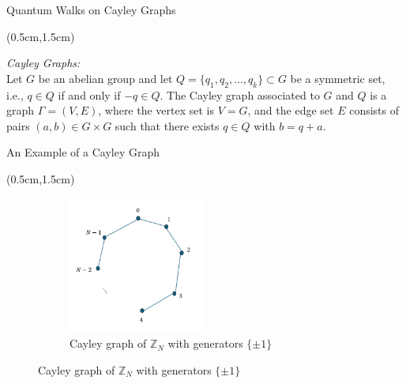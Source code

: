 \documentclass{beamer}
\theoremstyle{definition}
\begin{document}
\begin{frame}{Quantum Walks on Cayley Graphs}
    
    \begin{textblock*}{12cm}(0.5cm,1.5cm)
        
        \textit{Cayley Graphs:} \\
        \vspace{0.3cm}
        Let $G$ be an abelian group and let $Q = \{q_1, q_2, \dots, q_k\} \subset G$ be a symmetric set, i.e., $q \in Q$ if and only if $-q \in Q$. The Cayley graph associated to $G$ and $Q$ is a graph $\Gamma = (V, E)$, where the vertex set is $V = G$, and the edge set $E$ consists of pairs $(a, b) \in G \times G$ such that there exists $q \in Q$ with $b = q + a$. \\
      
    \end{textblock*}

\end{frame}




\begin{frame}{An Example of a Cayley Graph}
    
    \begin{textblock*}{12cm}(0.5cm,1.5cm)

        \begin{figure}
            \begin{figure}[h!]
                \centering
                \includegraphics[width=0.5\textwidth]{fig_1.png}  %
                \caption{Cayley graph of $\mathbb{Z}_N$ with generators $\{\pm 1\}$}
                \label{fig:cayley_z6}
            \end{figure}
        \end{figure}
        
       
    \end{textblock*}


\end{frame}
\end{document}
